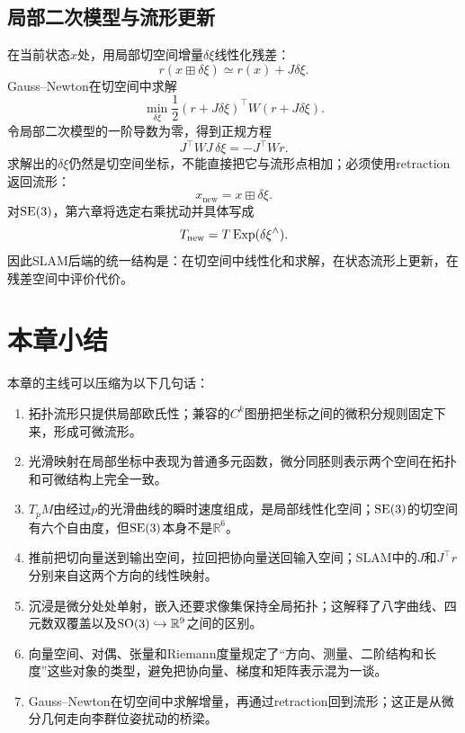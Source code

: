 \subsection{局部二次模型与流形更新}

在当前状态$x$处，用局部切空间增量$\delta\xi$线性化残差：
\[
    r(x\boxplus\delta\xi)
    \simeq r(x)+J\delta\xi.
\]
Gauss--Newton在切空间中求解
\[
    \min_{\delta\xi}
    \frac12(r+J\delta\xi)^\top W(r+J\delta\xi).
\]
令局部二次模型的一阶导数为零，得到正规方程
\[
    J^\top WJ\,\delta\xi=-J^\top Wr.
\]
求解出的$\delta\xi$仍然是切空间坐标，不能直接把它与流形点相加；必须使用retraction返回流形：
\[
    x_{\mathrm{new}}=x\boxplus\delta\xi.
\]
对$\operatorname{SE}(3)$，第六章将选定右乘扰动并具体写成
\[
    T_{\mathrm{new}}=T\operatorname{Exp}(\delta\xi^\wedge).
\]
因此SLAM后端的统一结构是：在切空间中线性化和求解，在状态流形上更新，在残差空间中评价代价。


\section*{本章小结}

本章的主线可以压缩为以下几句话：
\begin{enumerate}
    \item 拓扑流形只提供局部欧氏性；兼容的$C^k$图册把坐标之间的微积分规则固定下来，形成可微流形。
    \item 光滑映射在局部坐标中表现为普通多元函数，微分同胚则表示两个空间在拓扑和可微结构上完全一致。
    \item $T_pM$由经过$p$的光滑曲线的瞬时速度组成，是局部线性化空间；$\operatorname{SE}(3)$的切空间有六个自由度，但$\operatorname{SE}(3)$本身不是$\mathbb R^6$。
    \item 推前把切向量送到输出空间，拉回把协向量送回输入空间；SLAM中的$J$和$J^\top r$分别来自这两个方向的线性映射。
    \item 沉浸是微分处处单射，嵌入还要求像集保持全局拓扑；这解释了八字曲线、四元数双覆盖以及$\operatorname{SO}(3)\hookrightarrow\mathbb R^9$之间的区别。
    \item 向量空间、对偶、张量和Riemann度量规定了“方向、测量、二阶结构和长度”这些对象的类型，避免把协向量、梯度和矩阵表示混为一谈。
    \item Gauss--Newton在切空间中求解增量，再通过retraction回到流形；这正是从微分几何走向李群位姿扰动的桥梁。
\end{enumerate}
